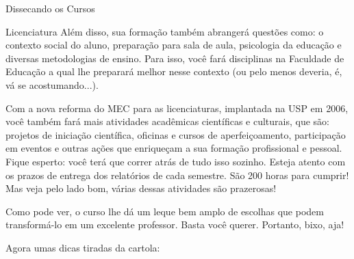 \begin{secao}{Dissecando os Cursos}
\begin{subsecao}{Licenciatura}
Além disso, sua formação também abrangerá questões como: o contexto social do aluno, preparação para sala de aula, psicologia da educação e diversas metodologias de ensino. Para isso, você fará disciplinas na Faculdade de Educação a qual lhe preparará melhor nesse contexto (ou pelo menos deveria, é, vá se acostumando...).

Com a nova reforma do MEC para as licenciaturas, implantada na USP em 2006, você também fará mais atividades acadêmicas científicas e culturais, que são: projetos de iniciação científica, oficinas e cursos de aperfeiçoamento, participação em eventos e outras ações que enriqueçam a sua formação profissional e pessoal. Fique esperto: você terá que correr atrás de tudo isso sozinho. Esteja atento com os prazos de entrega dos relatórios de cada semestre. São 200 horas para cumprir! Mas veja pelo lado bom, várias dessas atividades são prazerosas!

Como pode ver, o curso lhe dá um leque bem amplo de escolhas que podem transformá-lo em um excelente professor. Basta você querer. Portanto, bixo, aja!

Agora umas dicas tiradas da cartola: 


\end{subsecao}
\end{secao}
